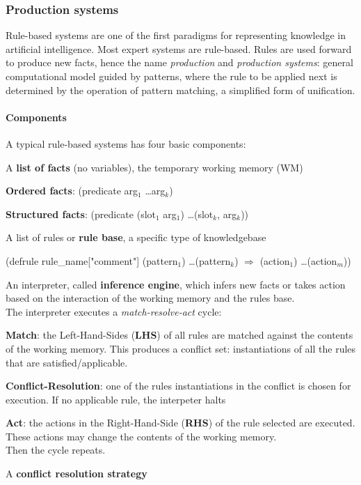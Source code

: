 \documentclass[10pt]{report}
\begin{document}
\subsubsection{Production systems} Rule-based systems are one of the first paradigms for representing knowledge in artificial intelligence. Most expert systems are rule-based. Rules are used forward to produce new facts, hence the name \textit{production} and \textit{production systems}: general computational model guided by patterns, where the rule to be applied next is determined by the operation of pattern matching, a simplified form of unification.
\paragraph{Components} A typical rule-based systems has four basic components:
\begin{list}{}{}
	\item A \textbf{list of facts} (no variables), the temporary working memory (WM)\begin{list}{}{}
		\item \textbf{Ordered facts}: (predicate arg$_1$ \ldots arg$_k$)
		\item \textbf{Structured facts}: (predicate (slot$_1$ arg$_1$) \ldots (slot$_k$, arg$_k$))
	\end{list}
	\item A list of rules or \textbf{rule base}, a specific type of knowledgebase
	\begin{list}{}{}
		\item (defrule rule\_name["comment"] (pattern$_1$) \ldots (pattern$_k$) $\Rightarrow$ (action$_1$) \ldots (action$_m$))
	\end{list}
	\item An interpreter, called \textbf{inference engine}, which infers new facts or takes action based on the interaction of the working memory and the rules base.\\
	The interpreter executes a \textit{match-resolve-act} cycle:
	\begin{list}{}{}
		\item \textbf{Match}: the Left-Hand-Sides (\textbf{LHS}) of all rules are matched against the contents of the working memory. This produces a conflict set: instantiations of all the rules that are satisfied/applicable.
		\item \textbf{Conflict-Resolution}: one of the rules instantiations in the conflict is chosen for execution. If no applicable rule, the interpeter halts
		\item \textbf{Act}: the actions in the Right-Hand-Side (\textbf{RHS}) of the rule selected are executed. These actions may change the contents of the working memory.\\
		Then the cycle repeats.
	\end{list}
	\item A \textbf{conflict resolution strategy}
\end{list}
\end{document}
